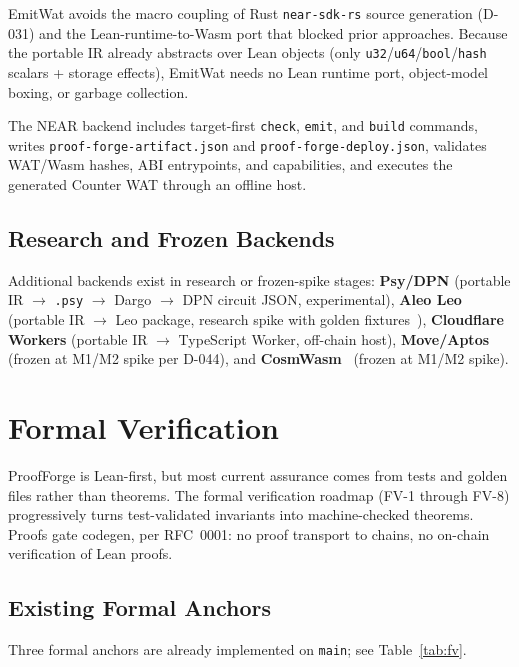 \documentclass[sigconf]{acmart}
\begin{document}
EmitWat avoids the macro coupling of Rust \texttt{near-sdk-rs} source generation (D-031) and
the Lean-runtime-to-Wasm port that blocked prior approaches. Because the portable IR already
abstracts over Lean objects (only \texttt{u32}/\texttt{u64}/\texttt{bool}/\texttt{hash} scalars
+ storage effects), EmitWat needs no Lean runtime port, object-model boxing, or garbage
collection.

The NEAR backend includes target-first \texttt{check}, \texttt{emit}, and \texttt{build}
commands, writes \texttt{proof-forge-artifact.json} and \texttt{proof-forge-deploy.json},
validates WAT/Wasm hashes, ABI entrypoints, and capabilities, and executes the generated
Counter WAT through an offline host.

\subsection{Research and Frozen Backends}

Additional backends exist in research or frozen-spike stages:
\textbf{Psy/DPN} (portable IR $\to$ \texttt{.psy} $\to$ Dargo $\to$ DPN circuit JSON, experimental),
\textbf{Aleo Leo} (portable IR $\to$ Leo package, research spike with golden fixtures~\cite{aleo}),
\textbf{Cloudflare Workers} (portable IR $\to$ TypeScript Worker, off-chain host),
\textbf{Move/Aptos}~\cite{move} (frozen at M1/M2 spike per D-044), and
\textbf{CosmWasm}~\cite{cosmwasm} (frozen at M1/M2 spike).

\section{Formal Verification}
\label{sec:fv}

ProofForge is Lean-first, but most current assurance comes from tests and golden files rather
than theorems. The formal verification roadmap (FV-1 through FV-8) progressively turns
test-validated invariants into machine-checked theorems. Proofs gate codegen, per RFC~0001:
no proof transport to chains, no on-chain verification of Lean proofs.

\subsection{Existing Formal Anchors}

Three formal anchors are already implemented on \texttt{main}; see Table~\ref{tab:fv}.
\end{document}
